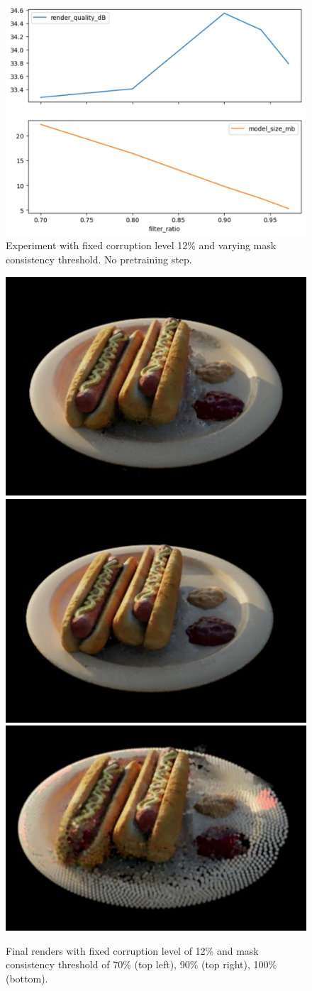 \documentclass[10pt,twocolumn,letterpaper]{article}
\begin{document}
\begin{figure}[h]
\centering
    \includegraphics[width=0.9\linewidth]{figures/softconstraint-experiment.png}
    \caption{Experiment with fixed corruption level 12\% and varying mask consistency threshold. No pretraining step. }
\label{fig:constraintexperiment}
\end{figure}

\begin{figure}[h]
\centering
    \includegraphics[width=0.45\linewidth]{figures/c12m70-r.png}
    \includegraphics[width=0.45\linewidth]{figures/c12m90-r.png}
    \includegraphics[width=0.45\linewidth]{figures/render12c.png} 
    \caption{ Final renders with fixed corruption level of 12\% and mask consistency threshold of 70\% (top left), 90\% (top right), 100\% (bottom). 
    }
    \label{fig:corruptionwrelaxrender}
\end{figure}
\end{document}
